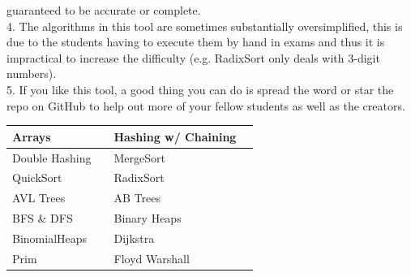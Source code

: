 \documentclass[12pt]{article}
\begin{document}
    guaranteed to be accurate or complete.
    \\[0.2in]
    4. The algorithms in this tool are sometimes substantially oversimplified, this is due to the students having to execute them by hand in exams
    and thus it is impractical to increase the difficulty (e.g. RadixSort only deals with 3-digit numbers).
    \\[0.2in]
    5. If you like this tool, a good thing you can do is spread the word or star the repo on GitHub to help out more of your fellow students as well as the creators.
    \vspace{20px}
    \begin{center}
        \begin{tabular}{|P{4cm}|P{1cm}||P{4cm}|P{1cm}|}
            \hline
            Arrays & %
            & Hashing w/ Chaining & %
            \\ \hline
            Double Hashing & %
            & MergeSort & %
            \\ \hline
            QuickSort & %
            & RadixSort & %
            \\ \hline
            AVL Trees & %
            & AB Trees & %
            \\ \hline
            BFS \& DFS & %
            & Binary Heaps & %
            \\ \hline
            BinomialHeaps & %
            & Dijkstra & %
            \\ \hline
            Prim & %
            & Floyd Warshall & %
            \\ \hline
        \end{tabular}
    \end{center}
\end{document}
